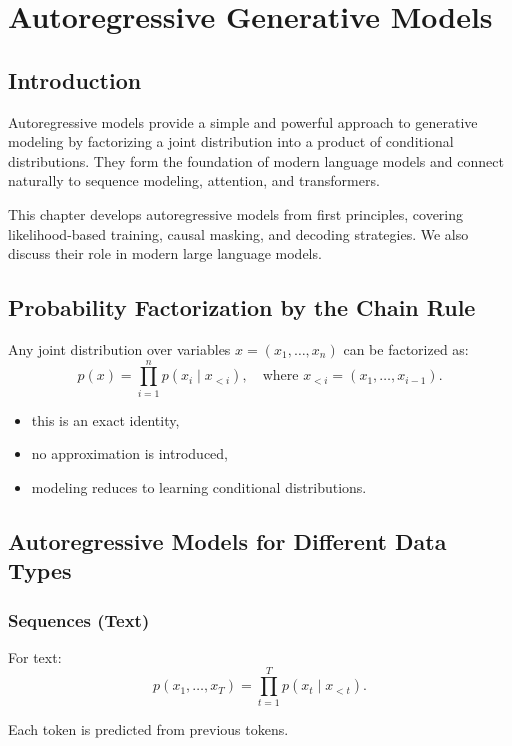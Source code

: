 \chapter{Autoregressive Generative Models}

\section{Introduction}

Autoregressive models provide a simple and powerful approach to generative modeling by factorizing a joint distribution into a product of conditional distributions. They form the foundation of modern language models and connect naturally to sequence modeling, attention, and transformers.

This chapter develops autoregressive models from first principles, covering likelihood-based training, causal masking, and decoding strategies. We also discuss their role in modern large language models.

\section{Probability Factorization by the Chain Rule}

Any joint distribution over variables $x = (x_1,\dots,x_n)$ can be factorized as:
\[
p(x) = \prod_{i=1}^n p(x_i \mid x_{<i}),
\quad \text{where } x_{<i} = (x_1,\dots,x_{i-1}).
\]

\begin{itemize}
    \item this is an exact identity,
    \item no approximation is introduced,
    \item modeling reduces to learning conditional distributions.
\end{itemize}

\section{Autoregressive Models for Different Data Types}

\subsection{Sequences (Text)}

For text:
\[
p(x_1,\dots,x_T) = \prod_{t=1}^T p(x_t \mid x_{<t}).
\]

Each token is predicted from previous tokens.

